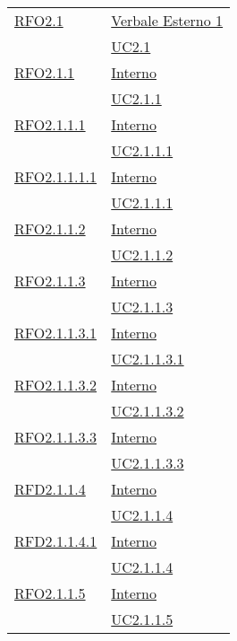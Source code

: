 \begin{longtable}{|>{\centering}m{5cm}|m{5cm}<{\centering}|}
\hyperlink{RFO2.1}{RFO2.1} & \hyperlink{Verbale Esterno 1}{Verbale Esterno 1}\\
& \hyperref[UC2.1]{UC2.1}\\ \hline

\hyperlink{RFO2.1.1}{RFO2.1.1} & \hyperlink{Interno}{Interno}\\
& \hyperref[UC2.1.1]{UC2.1.1}\\ \hline

\hyperlink{RFO2.1.1.1}{RFO2.1.1.1} & \hyperlink{Interno}{Interno}\\
& \hyperref[UC2.1.1.1]{UC2.1.1.1}\\ \hline

\hyperlink{RFO2.1.1.1.1}{RFO2.1.1.1.1} & \hyperlink{Interno}{Interno}\\
& \hyperref[UC2.1.1.1]{UC2.1.1.1}\\ \hline

\hyperlink{RFO2.1.1.2}{RFO2.1.1.2} & \hyperlink{Interno}{Interno}\\
& \hyperref[UC2.1.1.2]{UC2.1.1.2}\\ \hline

\hyperlink{RFO2.1.1.3}{RFO2.1.1.3} & \hyperlink{Interno}{Interno}\\
& \hyperref[UC2.1.1.3]{UC2.1.1.3}\\ \hline

\hyperlink{RFO2.1.1.3.1}{RFO2.1.1.3.1} & \hyperlink{Interno}{Interno}\\
& \hyperref[UC2.1.1.3.1]{UC2.1.1.3.1}\\ \hline

\hyperlink{RFO2.1.1.3.2}{RFO2.1.1.3.2} & \hyperlink{Interno}{Interno}\\
& \hyperref[UC2.1.1.3.2]{UC2.1.1.3.2}\\ \hline

\hyperlink{RFO2.1.1.3.3}{RFO2.1.1.3.3} & \hyperlink{Interno}{Interno}\\
& \hyperref[UC2.1.1.3.3]{UC2.1.1.3.3}\\ \hline

\hyperlink{RFD2.1.1.4}{RFD2.1.1.4} & \hyperlink{Interno}{Interno}\\
& \hyperref[UC2.1.1.4]{UC2.1.1.4}\\ \hline

\hyperlink{RFD2.1.1.4.1}{RFD2.1.1.4.1} & \hyperlink{Interno}{Interno}\\
& \hyperref[UC2.1.1.4]{UC2.1.1.4}\\ \hline

\hyperlink{RFO2.1.1.5}{RFO2.1.1.5} & \hyperlink{Interno}{Interno}\\
& \hyperref[UC2.1.1.5]{UC2.1.1.5}\\ \hline


\end{longtable}

